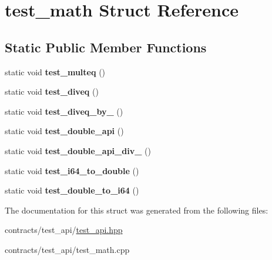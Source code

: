 \hypertarget{structtest__math}{}\section{test\+\_\+math Struct Reference}
\label{structtest__math}
\subsection*{Static Public Member Functions}
\begin{DoxyCompactItemize}
\item 
\mbox{\label{structtest__math_a3c86fcb93b17042763f79c097d6b455d}} 
static void {\bfseries test\+\_\+multeq} ()
\item 
\mbox{\label{structtest__math_a86dab3e7328cf605e2610526a361cd8c}} 
static void {\bfseries test\+\_\+diveq} ()
\item 
\mbox{\label{structtest__math_a3aa69fb1537eec76ba7fd9e28d1469cd}} 
static void {\bfseries test\+\_\+diveq\+\_\+by\+\_} ()
\item 
\mbox{\label{structtest__math_a79394e3887b9dfb736c6d201e39b639c}} 
static void {\bfseries test\+\_\+double\+\_\+api} ()
\item 
\mbox{\label{structtest__math_a606f05e2f669992c39ad19bd68d99701}} 
static void {\bfseries test\+\_\+double\+\_\+api\+\_\+div\+\_} ()
\item 
\mbox{\label{structtest__math_aaa0da5d4e6358d3285aded5069ae8430}} 
static void {\bfseries test\+\_\+i64\+\_\+to\+\_\+double} ()
\item 
\mbox{\label{structtest__math_addbbc47073efcdf96a6440770b34042e}} 
static void {\bfseries test\+\_\+double\+\_\+to\+\_\+i64} ()
\end{DoxyCompactItemize}


The documentation for this struct was generated from the following files\+:\begin{DoxyCompactItemize}
\item 
contracts/test\+\_\+api/\mbox{\hyperlink{test__api_8hpp}{test\+\_\+api.\+hpp}}\item 
contracts/test\+\_\+api/test\+\_\+math.\+cpp\end{DoxyCompactItemize}
